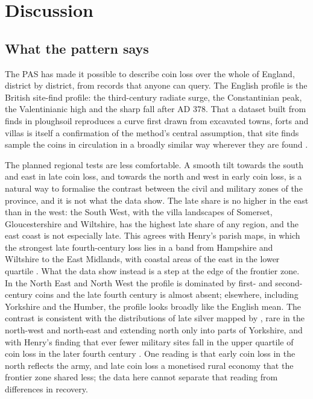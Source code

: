 \documentclass[11pt,a4paper]{article}
\begin{document}
\section{Discussion}\label{sec:disc}
\subsection{What the pattern says}
The PAS has made it possible to describe coin loss over the whole of England, district by district, from records that anyone can query. The English profile is the British site-find profile: the third-century radiate surge, the Constantinian peak, the Valentinianic high and the sharp fall after AD 378. That a dataset built from finds in ploughsoil reproduces a curve first drawn from excavated towns, forts and villas is itself a confirmation of the method's central assumption, that site finds sample the coins in circulation in a broadly similar way wherever they are found \citep{reece1995,walton2012}.

The planned regional tests are less comfortable. A smooth tilt towards the south and east in late coin loss, and towards the north and west in early coin loss, is a natural way to formalise the contrast between the civil and military zones of the province, and it is not what the data show. The late share is no higher in the east than in the west: the South West, with the villa landscapes of Somerset, Gloucestershire and Wiltshire, has the highest late share of any region, and the east coast is not especially late. This agrees with Henry's parish maps, in which the strongest late fourth-century loss lies in a band from Hampshire and Wiltshire to the East Midlands, with coastal areas of the east in the lower quartile \citep{henry2024}. What the data show instead is a step at the edge of the frontier zone. In the North East and North West the profile is dominated by first- and second-century coins and the late fourth century is almost absent; elsewhere, including Yorkshire and the Humber, the profile looks broadly like the English mean. The contrast is consistent with the distributions of late silver mapped by \citet{walton2016}, rare in the north-west and north-east and extending north only into parts of Yorkshire, and with Henry's finding that ever fewer military sites fall in the upper quartile of coin loss in the later fourth century \citep{henry2024}. One reading is that early coin loss in the north reflects the army, and late coin loss a monetised rural economy that the frontier zone shared less; the data here cannot separate that reading from differences in recovery.
\end{document}
